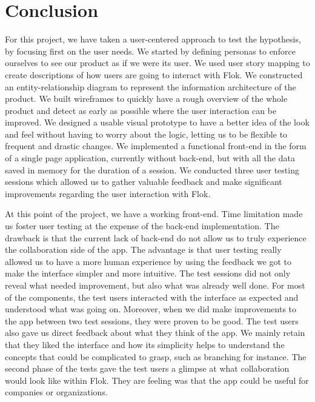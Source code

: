 \documentclass[a4paper,12pt, oneside]{article}
\begin{document}
\FloatBarrier
\section{Conclusion}

For this project, we have taken a user-centered approach to test the hypothesis, by focusing first on the user needs.
We started by defining personas to enforce ourselves to see our product as if we were its user.
We used user story mapping to create descriptions of how users are going to interact with Flok.
We constructed an entity-relationship diagram to represent the information architecture of the product.
We built wireframes to quickly have a rough overview of the whole product and detect as early as possible where the user interaction can be improved.
We designed a usable visual prototype to have a better idea of the look and feel without having to worry about the logic, letting us to be flexible to frequent and drastic changes.
We implemented a functional front-end in the form of a single page application, currently without back-end, but with all the data saved in memory for the duration of a session.
We conducted three user testing sessions which allowed us to gather valuable feedback and make significant improvements regarding the user interaction with Flok.

At this point of the project, we have a working front-end.
Time limitation made us foster user testing at the expense of the back-end implementation.
The drawback is that the current lack of back-end do not allow us to truly experience the collaboration side of the app.
The advantage is that user testing really allowed us to have a more human experience by using the feedback we got to make the interface simpler and more intuitive.
The test sessions did not only reveal what needed improvement, but also what was already well done.
For most of the components, the test users interacted with the interface as expected and understood what was going on.
Moreover, when we did make improvements to the app between two test sessions, they were proven to be good.
The test users also gave us direct feedback about what they think of the app.
We mainly retain that they liked the interface and how its simplicity helps to understand the concepts that could be complicated to grasp, such as branching for instance.
The second phase of the tests gave the test users a glimpse at what collaboration would look like within Flok.
They are feeling was that the app could be useful for companies or organizations.
\end{document}
